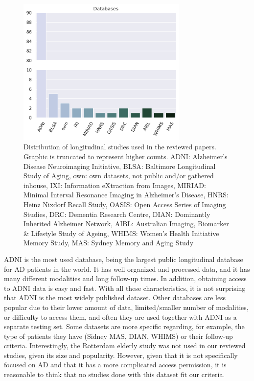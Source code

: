 \begin{figure}[!htbp]
  \centering
  \includegraphics[width=0.75\textwidth]{figures/review/Fig5.pdf}
  \caption[Distribution of longitudinal studies used in the reviewed papers.]{\small Distribution of longitudinal studies used in the reviewed papers. Graphic is truncated to represent higher counts. ADNI: Alzheimer's Disease Neuroimaging Initiative, BLSA: Baltimore Longitudinal Study of Aging, own: own datasets, not public and/or gathered inhouse, IXI: Information eXtraction from Images, MIRIAD: Minimal Interval Resonance Imaging in Alzheimer's Disease, HNRS: Heinz Nixdorf Recall Study, OASIS: Open Access Series of Imaging Studies, DRC: Dementia Research Centre, DIAN: Dominantly Inherited Alzheimer Network, AIBL: Australian Imaging, Biomarker $\&$ Lifestyle Study of Ageing, WHIMS: Women's Health Initiative Memory Study, MAS: Sydney Memory and Aging Study}\label{fig:db}
\end{figure}

ADNI \cite{Weiner2017} is the most used database, being the largest public longitudinal database for AD patients in the world. It has well organized and processed data, and it has many different modalities and long follow-up times. In addition, obtaining access to ADNI data is easy and fast. With all these characteristics, it is not surprising that ADNI is the most widely published dataset. Other databases are less popular due to their lower amount of data, limited/smaller number of modalities, or difficulty to access them, and often they are used together with ADNI \cite{Davatzikos2009,Eshaghi2017,Franke2012} as a separate testing set. Some datasets are more specific regarding, for example, the type of patients they have (Sidney MAS, DIAN, WHIMS) or their follow-up criteria. Interestingly, the Rotterdam elderly study \cite{Ikram2017} was not used in our reviewed studies, given its size and popularity. However, given that it is not specifically focused on AD and that it has a more complicated access permission, it is reasonable to think that no studies done with this dataset fit our criteria.  \\

